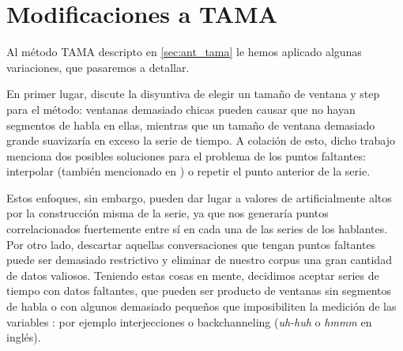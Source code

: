 \section{Modificaciones a TAMA}
\label{sec:tama_modifications}
Al método TAMA descripto en \ref{sec:ant_tama} le hemos aplicado algunas variaciones, que pasaremos a detallar.

En primer lugar, \cite{KOU2008.2} discute la disyuntiva de elegir un tamaño de ventana y step para el método: ventanas demasiado chicas pueden causar que no hayan segmentos de habla en ellas, mientras que un tamaño de ventana demasiado grande suavizaría en exceso la serie de tiempo. A colación de esto, dicho trabajo menciona dos posibles soluciones para el problema de los puntos faltantes: interpolar (también mencionado en \cite{DEL2013}) o repetir el punto anterior de la serie.

Estos enfoques, sin embargo, pueden dar lugar a valores de \entrainment artificialmente altos por la construcción misma de la serie, ya que nos generaría puntos correlacionados fuertemente entre sí en cada una de las series de los hablantes. Por otro lado, descartar aquellas conversaciones que tengan puntos faltantes puede ser demasiado restrictivo y eliminar de nuestro corpus una gran cantidad de datos valiosos. Teniendo estas cosas en mente, decidimos aceptar series de tiempo con datos faltantes, que pueden ser producto de ventanas sin segmentos de habla o con algunos demasiado pequeños que imposibiliten la medición de las variables \ap: por ejemplo interjecciones o backchanneling (\emph{uh-huh} o \emph{hmmm} en inglés).


